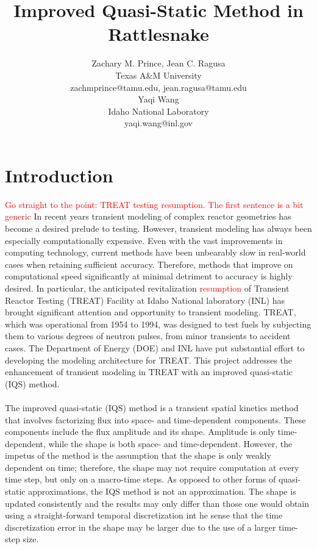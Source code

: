 \documentclass[11pt]{scrartcl}
\title{Improved Quasi-Static Method in Rattlesnake}
\author{ 
{\normalsize Zachary M. Prince, Jean C. Ragusa} \\ 
{\normalsize Texas A\&M University} \\  
{\normalsize zachmprince@tamu.edu, jean.ragusa@tamu.edu} \\ 
{\normalsize Yaqi Wang} \\ 
{\normalsize Idaho National Laboratory} \\  
{\normalsize yaqi.wang@inl.gov}
}
\newcommand{\tcr}[1]{\textcolor{red}{#1}}
\begin{document}
\maketitle
{}

\section{Introduction}
\tcr{Go straight to the point: TREAT testing resumption. The first sentence is a bit generic}
In recent years transient modeling of complex reactor geometries has become a desired prelude to testing.  However, transient modeling has always been especially computationally expensive. Even with the vast improvements in computing technology, current methods have been unbearably slow in real-world cases when retaining sufficient accuracy.  Therefore, methods that improve on computational speed significantly at minimal detriment to accuracy is highly desired.  In particular, the anticipated revitalization \tcr{resumption} of Transient Reactor Testing (TREAT) Facility at Idaho National laboratory (INL) has brought significant attention and opportunity to transient modeling.  TREAT, which was operational from 1954 to 1994, was designed to test fuels by subjecting them to various degrees of neutron pulses, from minor transients to accident cases.  The Department of Energy (DOE) and INL have put substantial effort to developing the modeling architecture for TREAT.  This project addresses the enhancement of transient modeling in TREAT with an improved quasi-static (IQS) method.
\\ \\
The improved quasi-static (IQS) method is a transient spatial kinetics method that involves factorizing flux into space- and time-dependent components.  These components include the flux amplitude and its shape. Amplitude is only time-dependent, while the shape is both space- and time-dependent.  However, the impetus of the method is the assumption that the shape is only weakly dependent on time; therefore, the shape may not require computation at every time step, but only on a macro-time steps. As opposed to other forms of 
quasi-static approximations, the IQS method is not an approximation. The shape is updated consistently and
the results may only differ than those one would obtain using a straight-forward temporal discretization int he sense that the time discretization error in the shape may be larger due to the use of a larger time-step size. 
\end{document}
